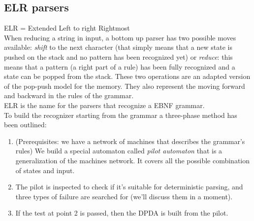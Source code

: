 \documentclass[10pt,a4paper]{article}
\begin{document}
			\subsection{ELR parsers}
				ELR = Extended Left to right Rightmost\\
				When reducing a string in input, a bottom up parser has two possible moves available: \emph{shift} to the next character (that simply means that a new state is pushed on the stack and no pattern has been recognized yet) or \emph{reduce}: this means that a pattern (a right part of a rule) has been fully recognized and a state can be popped from the stack. These two operations are an adapted version of the pop-push model for the memory. They also represent the moving forward and backward in the rules of the grammar.\\
				ELR is the name for the parsers that recognize a EBNF grammar.\\
				To build the recognizer starting from the grammar a three-phase method has been outlined:
				\begin{enumerate}
					\item (Prerequisites: we have a network of machines that describes the grammar's rules) We build a special automaton called \emph{pilot automaton} that is a generalization of the machines network. It covers all the possible combination of states and input.
					\item The pilot is inspected to check if it's suitable for deterministic parsing, and three types of failure are searched for (we'll discuss them in a moment).
					\item If the test at point 2 is passed, then the DPDA is built from the pilot. 
				\end{enumerate}
				
\end{document}
